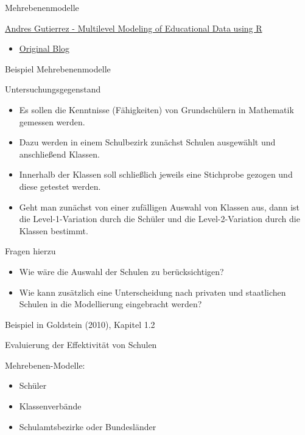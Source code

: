\documentclass[ignorenonframetext,]{beamer}
\providecommand{\tightlist}{%
\setlength{\itemsep}{0pt}\setlength{\parskip}{0pt}}
\begin{document}
\begin{frame}[fragile]{Mehrebenenmodelle}
\begin{block}{\href{https://www.r-bloggers.com/multilevel-modeling-of-educational-data-using-r-part-1/}{Andres
Gutierrez - Multilevel Modeling of Educational Data using R}}
\begin{itemize}
\tightlist
\item
  \href{http://hagutierrezro.blogspot.de/2016/10/multilevel-modeling-of-educational-data.html}{Original
  Blog}
\end{itemize}

\end{block}

\begin{block}{Beispiel Mehrebenenmodelle}

Untersuchungsgegenstand

\begin{itemize}
\item
  Es sollen die Kenntnisse (Fähigkeiten) von Grundschülern in Mathematik
  gemessen werden.
\item
  Dazu werden in einem Schulbezirk zunächst Schulen ausgewählt und
  anschließend Klassen.
\item
  Innerhalb der Klassen soll schließlich jeweils eine Stichprobe gezogen
  und diese getestet werden.
\item
  Geht man zunächst von einer zufälligen Auswahl von Klassen aus, dann
  ist die Level-1-Variation durch die Schüler und die Level-2-Variation
  durch die Klassen bestimmt.
\end{itemize}

\end{block}

\begin{block}{Fragen hierzu}

\begin{itemize}
\item
  Wie wäre die Auswahl der Schulen zu berücksichtigen?
\item
  Wie kann zusätzlich eine Unterscheidung nach privaten und staatlichen
  Schulen in die Modellierung eingebracht werden?
\end{itemize}

\end{block}

\begin{block}{Beispiel in Goldstein (2010), Kapitel 1.2}

Evaluierung der Effektivität von Schulen

Mehrebenen-Modelle:

\begin{itemize}
\tightlist
\item
  Schüler
\item
  Klassenverbände
\item
  Schulamtsbezirke oder Bundesländer
\end{itemize}


\end{block}
\end{frame}
\end{document}
